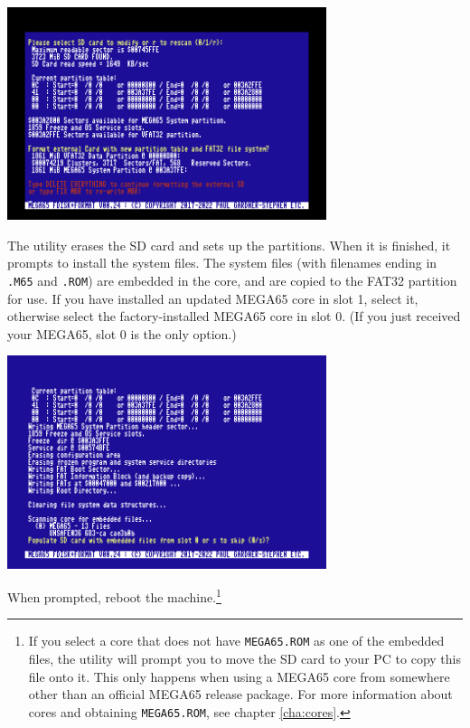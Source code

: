 \begin{center}
  \includegraphics[width=0.7\textwidth]{images/ss-m65fdisk-typesomething.png}
\end{center}

The utility erases the SD card and sets up the partitions. When it is finished, it prompts to install the system files. The system files (with filenames ending in {\tt .M65} and {\tt .ROM}) are embedded in the core, and are copied to the FAT32 partition for use. If you have installed an updated MEGA65 core in slot 1, select it, otherwise select the factory-installed MEGA65 core in slot 0. (If you just received your MEGA65, slot 0 is the only option.)

\begin{center}
  \includegraphics[width=0.7\textwidth]{images/ss-m65fdisk-populate.png}
\end{center}

When prompted, reboot the machine.\footnote{If you select a core that does not have {\tt MEGA65.ROM} as one of the embedded files, the utility will prompt you to move the SD card to your PC to copy this file onto it. This only happens when using a MEGA65 core from somewhere other than an official MEGA65 release package. For more information about cores and obtaining {\tt MEGA65.ROM}, see chapter \vref{cha:cores}.}

